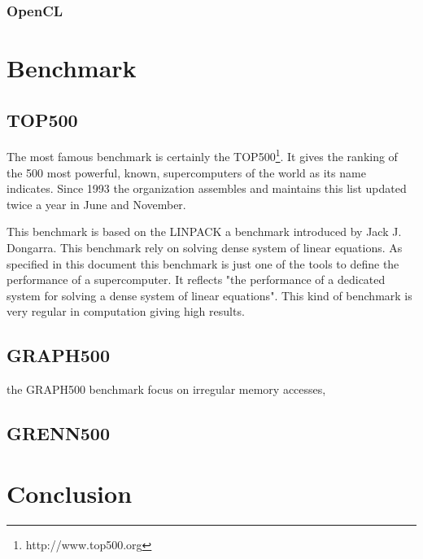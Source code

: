 \subsubsection{OpenCL}


\section{Benchmark}

\subsection{TOP500}
The most famous benchmark is certainly the TOP500\footnote{http://www.top500.org}. 
It gives the ranking of the 500 most powerful, known, supercomputers of the world as its name indicates.
Since 1993 the organization assembles and maintains this list updated twice a year in June and November.

This benchmark is based on the LINPACK\cite{dongarra1994top500} a benchmark introduced by Jack J. Dongarra.
This benchmark rely on solving  dense system of linear equations. 
As specified in this document this benchmark is just one of the tools to define the performance of a supercomputer. 
It reflects "the performance of a dedicated system for solving a dense system of linear equations".
This kind of benchmark is very regular in computation giving high results. 

\subsection{GRAPH500}
the GRAPH500 benchmark focus on irregular memory accesses, 


\subsection{GRENN500}

\section{Conclusion}


